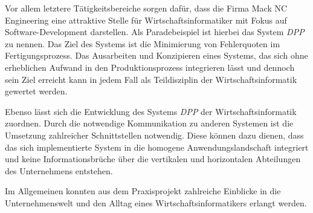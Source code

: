 \documentclass[
    type=Projektarbeit,
    status=draft, %
    language=german, %
    bibengine=bibtex,
]{unibwm-inf-thesis}
\begin{document}
    Vor allem letztere Tätigkeitsbereiche sorgen dafür, dass die Firma Mack NC Engineering eine attraktive Stelle für Wirtschaftsinformatiker mit Fokus auf Software-Development darstellen.
    Als Paradebeispiel ist hierbei das System \textit{DPP} zu nennen.
    Das Ziel des Systems ist die Minimierung von Fehlerquoten im Fertigungsprozess.
    Das Ausarbeiten und Konzipieren eines Systems, das sich ohne erheblichen Aufwand in den Produktionsprozess integrieren lässt und dennoch sein Ziel erreicht kann in jedem Fall als Teildisziplin der Wirtschaftsinformatik gewertet werden.

    Ebenso lässt sich die Entwicklung des Systems \textit{DPP} der Wirtschaftsinformatik zuordnen.
    Durch die notwendige Kommunikation zu anderen Systemen ist die Umsetzung zahlreicher Schnittstellen notwendig.
    Diese können dazu dienen, dass das sich implementierte System in die homogene Anwendungslandschaft integriert und keine Informationsbrüche über die vertikalen und horizontalen Abteilungen des Unternehmens entstehen.

    Im Allgemeinen konnten aus dem Praxisprojekt zahlreiche Einblicke in die Unternehmenswelt und den Alltag eines Wirtschaftsinformatikers erlangt werden.

    
    \backmatter
    
    
\end{document}

